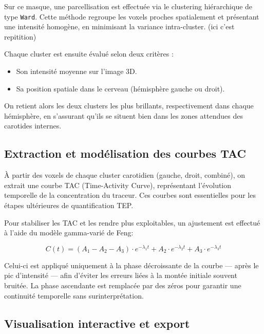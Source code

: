 \documentclass{article}
\begin{document}
        \noindent
        Sur ce masque, une parcellisation est effectuée via le clustering hiérarchique de type \texttt{Ward}. Cette méthode regroupe les voxels proches spatialement et présentant une intensité homogène, en minimisant la variance intra-cluster. (ici c'est repitition)
        
        \noindent
        Chaque cluster est ensuite évalué selon deux critères :
        \begin{itemize}
            \item Son intensité moyenne sur l’image 3D.
            \item Sa position spatiale dans le cerveau (hémisphère gauche ou droit).
        \end{itemize}
        
        \noindent
        On retient alors les deux clusters les plus brillants, respectivement dans chaque hémisphère, en s’assurant qu’ils se situent bien dans les zones attendues des carotides internes.
        
        \vspace{0.5em}
    \subsection*{Extraction et modélisation des courbes TAC}
        
        \noindent
        À partir des voxels de chaque cluster carotidien (gauche, droit, combiné), on extrait une courbe TAC (Time-Activity Curve), représentant l’évolution temporelle de la concentration du traceur. Ces courbes sont essentielles pour les étapes ultérieures de quantification TEP.
        
        \noindent
        Pour stabiliser les TAC et les rendre plus exploitables, un ajustement est effectué à l’aide du modèle gamma-varié de Feng:
        
        \[C(t) = (A_1 - A_2 - A_3) \cdot e^{-\lambda_1 t} + A_2 \cdot e^{-\lambda_2 t} + A_3 \cdot e^{-\lambda_3 t}\]

        
        \noindent
        Celui-ci est appliqué uniquement à la phase décroissante de la courbe — après le pic d’intensité — afin d’éviter les erreurs liées à la montée initiale souvent bruitée. La phase ascendante est remplacée par des zéros pour garantir une continuité temporelle sans surinterprétation.
        
    \vspace{0.5em}
    \subsection*{Visualisation interactive et export}
        
\end{document}
